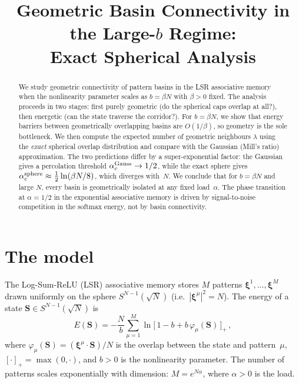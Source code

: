 \documentclass[11pt]{article}
\title{Geometric Basin Connectivity in the Large-$b$ Regime:\\
  Exact Spherical Analysis}
\author{}
\date{}
\newcommand{\vp}{\varphi}
\newcommand{\bS}{\mathbf{S}}
\newcommand{\bxi}{\boldsymbol{\xi}}
\begin{document}
\maketitle

\begin{abstract}
We study geometric connectivity of pattern basins in the
LSR associative memory when the nonlinearity parameter scales as
$b = \beta N$ with $\beta > 0$ fixed.
The analysis proceeds in two stages: first purely geometric
(do the spherical caps overlap at all?), then energetic
(can the state traverse the corridor?).
For $b = \beta N$, we show that energy barriers between
geometrically overlapping basins are $O(1/\beta)$,
so geometry is the sole bottleneck.
We then compute the expected number of geometric neighbours
$\lambda$ using the \emph{exact} spherical overlap distribution
and compare with the Gaussian (Mill's ratio) approximation.
The two predictions differ by a super-exponential factor:
the Gaussian gives a percolation threshold
$\alpha_c^{\rm Gauss} \to 1/2$,
while the exact sphere gives
$\alpha_c^{\rm sphere} \approx \tfrac{1}{2}\ln(\beta N/8)$,
which diverges with~$N$.
We conclude that for $b = \beta N$ and large $N$,
every basin is geometrically isolated at any fixed load~$\alpha$.
The phase transition at $\alpha = 1/2$ in the exponential
associative memory is driven by signal-to-noise competition
in the softmax energy, not by basin connectivity.
\end{abstract}


\section{The model}
\label{sec:model}

The Log-Sum-ReLU (LSR) associative memory stores $M$ patterns
$\bxi^1, \ldots, \bxi^M$ drawn uniformly on the sphere
$S^{N-1}(\sqrt{N})$ (i.e.\ $|\bxi^\mu|^2 = N$).
The energy of a state $\bS \in S^{N-1}(\sqrt{N})$ is
\begin{equation}\label{eq:E}
  E(\bS) = -\frac{N}{b}\sum_{\mu=1}^{M}
    \ln\bigl[\,1 - b + b\,\vp_\mu(\bS)\,\bigr]_+\,,
\end{equation}
where $\vp_\mu(\bS) = (\bxi^\mu \cdot \bS)/N$ is the overlap
between the state and pattern~$\mu$,
$[\cdot]_+ = \max(0, \cdot)$,
and $b > 0$ is the nonlinearity parameter.
The number of patterns scales exponentially with dimension:
$M = e^{N\alpha}$, where $\alpha > 0$ is the load.
\end{document}
